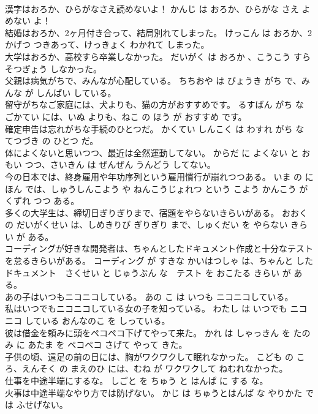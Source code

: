 \documentclass[8pt]{extreport}
\begin{document}
\begin{CJK}{UTF8}{min}
\\	漢字はおろか、ひらがなさえ読めないよ！	かんじ は おろか、ひらがな さえ よめない よ！	
\\	結婚はおろか、2ヶ月付き合って、結局別れてしまった。	けっこん は おろか、2 かげつ つきあって、けっきょく わかれて しまった。	
\\	大学はおろか、高校すら卒業しなかった。	だいがく は おろか 、こうこう すら そつぎょう しなかった。	
\\	父親は病気がちで、みんなが心配している。	ちちおや は びょうき がち で、みんな が しんぱい している。	
\\	留守がちなご家庭には、犬よりも、猫の方がおすすめです。	るすばん がち な ごかてい には、いぬ よりも、ねこ の ほう が おすすめ です。	
\\	確定申告は忘れがちな手続のひとつだ。	かくてい しんこく は わすれ がち な てつづき の ひとつ だ。	
\\	体によくないと思いつつ、最近は全然運動してない。	からだ に よくない と おもい つつ、さいきん は ぜんぜん うんどう してない。	
\\	今の日本では、終身雇用や年功序列という雇用慣行が崩れつつある。	いま の にほん では、しゅうしんこよう や ねんこうじょれつ という こよう かんこう が くずれ つつ ある。	
\\	多くの大学生は、締切日ぎりぎりまで、宿題をやらないきらいがある。	おおく の だいがくせい は、しめきりび ぎりぎり まで、しゅくだい を やらない きらい が ある。	
\\	コーディングが好きな開発者は、ちゃんとしたドキュメント作成と十分なテストを怠るきらいがある。	コーディング が すきな かいはつしゃ は、ちゃんと した ドキュメント　さくせい と じゅうぶん な　テスト を おこたる きらい が ある。	
\\	あの子はいつもニコニコしている。	あの こ は いつも ニコニコしている。	
\\	私はいつでもニコニコしている女の子を知っている。	わたし は いつでも ニコニコ している おんなのこ を しっている。	
\\	彼は借金を頼みに頭をペコペコ下げてやって来た。	かれ は しゃっきん を たのみ に あたま を ペコペコ さげて やって きた。	
\\	子供の頃、遠足の前の日には、胸がワクワクして眠れなかった。	こども の ころ、えんそく の まえのひ には、むね が ワクワクして ねむれなかった。	
\\	仕事を中途半端にするな。	しごと を ちゅう と はんぱ に する な。	
\\	火事は中途半端なやり方では防げない。	かじ は ちゅうとはんぱ な やりかた では ふせげない。	

\end{CJK}
\end{document}
